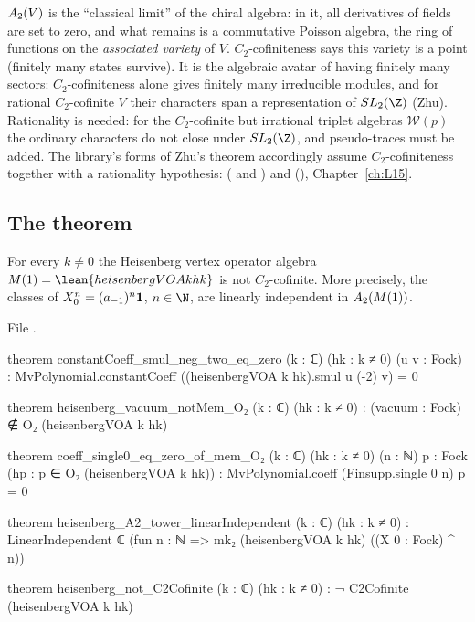 \begin{physics}
$A_2(V)$ is the ``classical limit'' of the chiral algebra: in it, all derivatives of fields are set to
zero, and what remains is a commutative Poisson algebra, the ring of functions on the \emph{associated
variety} of $V$. $C_2$-cofiniteness says this variety is a point (finitely many states survive). It is the
algebraic avatar of having finitely many sectors: $C_2$-cofiniteness alone gives finitely many irreducible
modules, and for rational $C_2$-cofinite $V$ their characters span a representation of $SL_2(\Z)$ (Zhu). Rationality
is needed: for the $C_2$-cofinite but irrational triplet algebras $\mathcal W(p)$ the ordinary characters do not close
under $SL_2(\Z)$, and pseudo-traces must be added. The library's forms of Zhu's theorem accordingly assume
$C_2$-cofiniteness together with a rationality hypothesis: \allowbreak{}\allowbreak{}\allowbreak{}
( and ) and  (),
Chapter~\ref{ch:L15}.
\end{physics}

\subsection{The theorem}

\begin{theorem}\label{l05:thm:notC2}
For every $k\ne0$ the Heisenberg vertex operator algebra $M(1)=\lean{heisenbergVOA k hk}$ is not
$C_2$-cofinite. More precisely, the classes of $X_0^n=(a_{-1})^n\mathbf{1}$, $n\in\N$, are linearly independent
in $A_2(M(1))$.
\end{theorem}

\noindent File .
\begin{leancode}
theorem constantCoeff_smul_neg_two_eq_zero (k : ℂ) (hk : k ≠ 0) (u v : Fock) :
    MvPolynomial.constantCoeff ((heisenbergVOA k hk).smul u (-2) v) = 0

theorem heisenberg_vacuum_notMem_O₂ (k : ℂ) (hk : k ≠ 0) :
    (vacuum : Fock) ∉ O₂ (heisenbergVOA k hk)

theorem coeff_single0_eq_zero_of_mem_O₂ (k : ℂ) (hk : k ≠ 0) (n : ℕ) {p : Fock}
    (hp : p ∈ O₂ (heisenbergVOA k hk)) :
    MvPolynomial.coeff (Finsupp.single 0 n) p = 0

theorem heisenberg_A2_tower_linearIndependent (k : ℂ) (hk : k ≠ 0) :
    LinearIndependent ℂ (fun n : ℕ => mk₂ (heisenbergVOA k hk) ((X 0 : Fock) ^ n))

theorem heisenberg_not_C2Cofinite (k : ℂ) (hk : k ≠ 0) :
    ¬ C2Cofinite (heisenbergVOA k hk)
\end{leancode}

